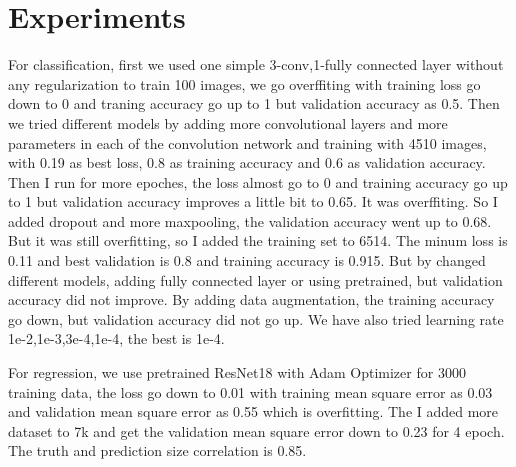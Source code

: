 \documentclass[10pt,twocolumn,letterpaper]{article}
\begin{document}

 \section{Experiments}
For classification, first we used one simple 3-conv,1-fully connected layer without any regularization to train 100 images, we go overffiting with training loss go down to 0 and traning accuracy go up to 1 but validation accuracy as 0.5. Then we tried different models by adding more convolutional layers and more parameters in each of the convolution network and training with 4510 images, with 0.19 as best loss, 0.8 as training accuracy and 0.6 as validation accuracy.  Then I run for more epoches, the loss almost go to 0 and training accuracy go up to 1 but validation accuracy improves a little bit to 0.65. It was overffiting. So I added dropout and more maxpooling, the validation accuracy went up to 0.68. But it was still overfitting, so I added the training set to 6514. The minum loss is 0.11 and best validation is 0.8 and training accuracy is 0.915. But by changed different models, adding fully connected layer or using pretrained, but validation accuracy did not improve. By adding data augmentation, the training accuracy go down, but validation accuracy did not go up. 
We have also tried learning rate 1e-2,1e-3,3e-4,1e-4, the best is 1e-4.

For regression, we use pretrained ResNet18 with Adam Optimizer for 3000 training data, the loss go down to 0.01 with training mean square error as 0.03 and validation mean square error as 0.55 which is overfitting. The I added more dataset to 7k and get the validation mean square error down to 0.23 for 4 epoch. The truth and prediction size correlation is 0.85. 


\

{\small


}
\end{document}
